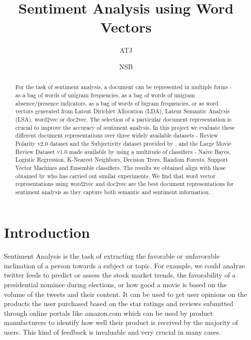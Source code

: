 \documentclass[11pt, oneside]{article}
\title{Sentiment Analysis using Word Vectors}
\author{ATJ}
\author{NSB}
\affil{University of Massachussets, Amherst}
\date{}
\begin{document}
\maketitle
{}
\newpage
{}
\begin{abstract}
For the task of sentiment analysis, a document can be represented in multiple forms - as a bag of words of unigram frequencies, as a bag of words of unigram absence/presence indicators, as a bag of words of bigram frequencies, or as word vectors generated from Latent Dirichlet Allocation (LDA), Latent Semantic Analysis (LSA), word2vec or doc2vec. The selection of a particular document representation is crucial to improve the accuracy of sentiment analysis. In this project we evaluate these different document representations over three widely available datasets - Review Polarity v2.0 dataset and the Subjectivity dataset provided by \cite{pang2004sentimental}, and the Large Movie Review Dataset v1.0 made available by \cite{maas2011learning} using a multitude of classifiers - Naïve Bayes, Logistic Regression, K-Nearest Neighbors, Decision Trees, Random Forests, Support Vector Machines and Ensemble classifiers. The results we obtained align with those obtained by \cite{maas2011learning} who has carried out similar experiments. We find that word vector representations using word2vec and doc2vec are the best document representations for sentiment analysis as they capture both semantic and sentiment information. 
\end{abstract}
\section{Introduction}
\paragraph{}
Sentiment Analysis is the task of extracting the favorable or unfavorable inclination of a person towards a subject or topic. For example, we could analyze twitter feeds to predict or assess the stock market trends, the favorability of a presidential nominee during elections, or how good a movie is based on the volume of the tweets and their content. It can be used to get user opinions on the products the user purchased based on the star ratings and reviews submitted through online portals like amazon.com which can be used by product manufacturers to identify how well their product is received by the majority of users. This kind of feedback is invaluable and very crucial in many cases.
\end{document}

